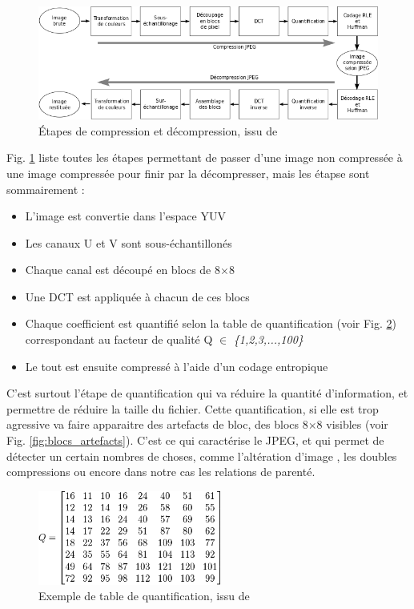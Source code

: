\documentclass[utf8]{stageM2R} %
\begin{document}
\begin{figure}[H]
  \begin{center}
    \includegraphics[width=120mm]{images/jpeg.png}
    \caption{Étapes de compression et décompression, issu de \cite{jpeg}}
    \label{fig:jpeg}
  \end{center}
\end{figure}

Fig. \ref{fig:jpeg} liste toutes les étapes permettant de passer d'une image non compressée à une image compressée pour finir par la décompresser, mais les étapse sont sommairement : 

\begin{itemize}
  \item L'image est convertie dans l'espace YUV
  \item Les canaux U et V sont sous-échantillonés
  \item Chaque canal est découpé en blocs de 8$\times$8
  \item Une DCT est appliquée à chacun de ces blocs
  \item Chaque coefficient est quantifié selon la table de quantification (voir Fig. \ref{fig:quantization_table}) correspondant au facteur de qualité Q $\in$ \textit{\{1,2,3,...,100\}}
  \item Le tout est ensuite compressé à l'aide d'un codage entropique
\end{itemize}

C'est surtout l'étape de quantification qui va réduire la quantité d'information, et permettre de réduire la taille du fichier. Cette quantification, si elle est trop agressive va faire apparaitre des artefacts de bloc, des blocs 8$\times$8 visibles (voir Fig. \ref{fig:blocs_artefacts}). C'est ce qui caractérise le JPEG, et qui permet de détecter un certain nombres de choses, comme l'altération d'image \cite{bianchi2012image}, les doubles compressions \cite{bianchi2012detection} ou encore dans notre cas les relations de parenté.

\begin{figure}[H]
  \begin{center}
    \includegraphics[width=60mm]{images/quantization_table.png}
    \caption{Exemple de table de quantification, issu de \cite{jpeg}}
    \label{fig:quantization_table}
  \end{center}
\end{figure}
\end{document}
